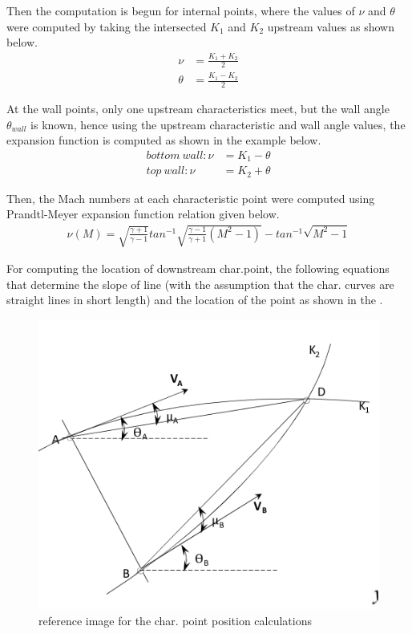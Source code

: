 \par Then the computation is begun for internal points, where the values of
$\nu$ and $\theta$ were computed by taking the intersected $K_1$ and $K_2$
upstream values as shown below.
\begin{align*}
    \nu &= \frac{K_1 + K_2}{2} \\
    \theta &= \frac{K_1 - K_2}{2}
\end{align*}

\par At the wall points, only one upstream characteristics meet, but the
wall angle $\theta_{wall}$ is known, hence using the upstream characteristic
and wall angle values, the expansion function is computed as shown in the
example below.
\begin{align*}
    bottom\ wall: \nu &= K_1 - \theta \\
    top\ wall: \nu &= K_2 + \theta
\end{align*}

\par Then, the Mach numbers at each characteristic point were computed using
Prandtl-Meyer expansion function relation given below.
\begin{align*}
    \nu(M) = \sqrt{\frac{\gamma+1}{\gamma-1}}tan^{-1}\sqrt{\frac{\gamma-1}{\gamma+1}\left(M^2-1\right)} - tan^{-1}\sqrt{M^2-1}
\end{align*}

\par For computing the location of downstream char.point, the following equations
that determine the slope of line (with the assumption that the char. curves are
straight lines in short length) and the location of the point as shown in the
.
\begin{figure}
    \center
    \includegraphics[scale=0.5]{results/slopeImage.png}
    \caption{reference image for the char. point position calculations}
    \label{slope_image}
\end{figure}


